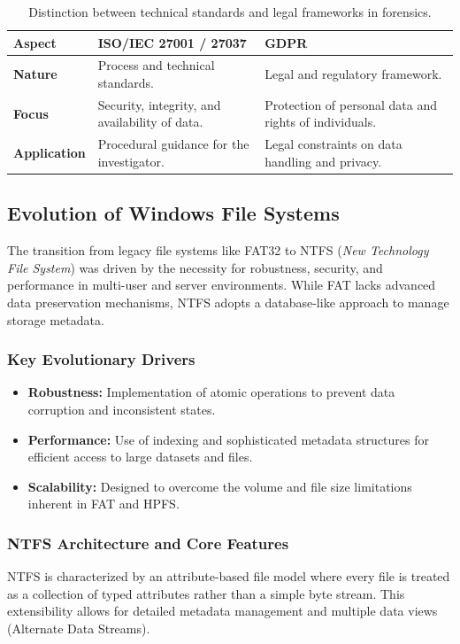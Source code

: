 \begin{table}[H]
\centering
\small
\begin{tabular}{|l|p{4cm}|p{4cm}|}
\hline
\textbf{Aspect} & \textbf{ISO/IEC 27001 / 27037} & \textbf{GDPR} \\
\hline
\textbf{Nature} & Process and technical standards. & Legal and regulatory framework. \\
\hline
\textbf{Focus} & Security, integrity, and availability of data. & Protection of personal data and rights of individuals. \\
\hline
\textbf{Application} & Procedural guidance for the investigator. & Legal constraints on data handling and privacy. \\
\hline
\end{tabular}
\caption{Distinction between technical standards and legal frameworks in forensics.}
\end{table}


\subsection{Evolution of Windows File Systems}
The transition from legacy file systems like FAT32 to NTFS (\textit{New Technology File System}) was driven by the necessity for robustness, security, and performance in multi-user and server environments. While FAT lacks advanced data preservation mechanisms, NTFS adopts a database-like approach to manage storage metadata.

\subsubsection*{Key Evolutionary Drivers}
\begin{itemize}
    \item \textbf{Robustness:} Implementation of atomic operations to prevent data corruption and inconsistent states.
    \item \textbf{Performance:} Use of indexing and sophisticated metadata structures for efficient access to large datasets and files.
    \item \textbf{Scalability:} Designed to overcome the volume and file size limitations inherent in FAT and HPFS.
\end{itemize}

\subsubsection{NTFS Architecture and Core Features}
NTFS is characterized by an attribute-based file model where every file is treated as a collection of typed attributes rather than a simple byte stream. This extensibility allows for detailed metadata management and multiple data views (Alternate Data Streams).


